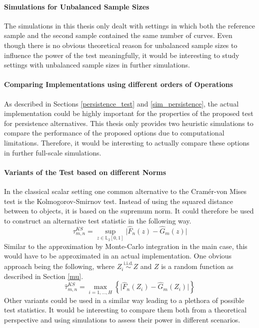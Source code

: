 \documentclass[12pt, a4paper]{article}
\theoremstyle{MAstyle} \newtheorem{assumption}{Assumption}[section]
\theoremstyle{MAstyle} \newtheorem{definition}{Definition}[section]
\theoremstyle{MAstyle} \newtheorem{theorem}{Theorem}[section]
\begin{document}
			\paragraph{Simulations for Unbalanced Sample Sizes\\}
			The simulations in this thesis only dealt with settings in which both the reference sample and the second sample contained the same number of curves. Even though there is no obvious theoretical reason for unbalanced sample sizes to influence the power of the test meaningfully, it would be interesting to study settings with unbalanced sample sizes in further simulations.		
			
			\paragraph{Comparing Implementations using different orders of Operations\\}
			As described in Sections \ref{persistence_test} and \ref{sim_persistence}, the actual implementation could be highly important for the properties of the proposed test for persistence alternatives. This thesis only provides two heuristic simulations to compare the performance of the proposed options due to computational limitations. Therefore, it would be interesting to actually compare these options in further full-scale simulations.
			
			\paragraph{Variants of the Test based on different Norms\\}
			In the classical scalar setting one common alternative to the Cram\'{e}r-von Mises test is the Kolmogorov-Smirnov test. Instead of using the squared distance between to objects, it is based on the supremum norm. It could therefore be used to construct an alternative test statistic in the following way. 
			\begin{equation}
				\tau^{\textit{KS}}_{m,n} = \sup_{z \in \mathbb{L}_2[0,1]} \vert \hat{F}_n(z) - \hat{G}_m(z) \vert
			\end{equation}
			Similar to the approximation by Monte-Carlo integration in the main case, this would have to be approximated in an actual implementation. One obvious approach being the following, where $Z_i \stackrel{\text{i.i.d.}}{\sim} Z$ and $Z$ is a random function as described in Section \ref{mu}.
			\begin{equation}
				\hat{\tau}^{\textit{KS}}_{m,n} = \max_{i = 1, \dots, H}\left\{\vert \hat{F}_n(Z_i) - \hat{G}_m(Z_i) \vert \right\}
			\end{equation}
			Other variants could be used in a similar way leading to a plethora of possible test statistics. It would be interesting to compare them both from a theoretical perspective and using simulations to assess their power in different scenarios.
		
\end{document}
